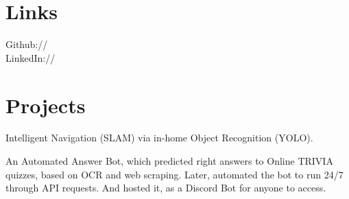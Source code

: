 \documentclass[]{deedy-resume-openfont}
\begin{document}
\begin{minipage}[t]{0.33\textwidth}
\sectionsep




\section{Links} 
Github:// \href{https://github.com/nishu88}{} \\
LinkedIn://  \href{https://www.linkedin.com/in/nishanth-d-aluhonnu-a3687712a/}{} \\
\sectionsep


%
%

\end{minipage} 
\hfill
\begin{minipage}[t]{0.66\textwidth} 







\section{Projects}



\textbullet{} Intelligent Navigation (SLAM) via in-home Object Recognition (YOLO).



\textbullet{} An Automated Answer Bot, which predicted right answers to Online TRIVIA quizzes, based on OCR and web scraping.
\textbullet{} Later, automated the bot to run 24/7 through API requests. And hosted it, as a Discord Bot for anyone to access.


\end{minipage}
\end{document}
